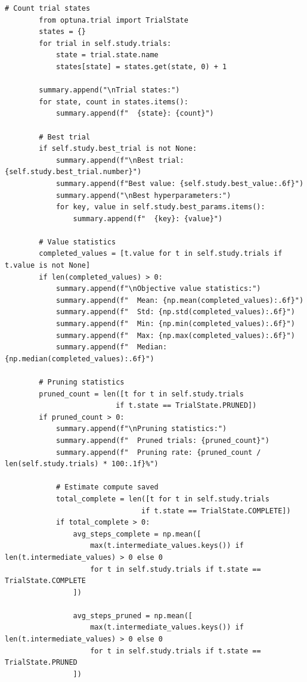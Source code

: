 \begin{lstlisting}[style=python, caption=Comprehensive HPO analysis and visualization]
        # Count trial states
        from optuna.trial import TrialState
        states = {}
        for trial in self.study.trials:
            state = trial.state.name
            states[state] = states.get(state, 0) + 1

        summary.append("\nTrial states:")
        for state, count in states.items():
            summary.append(f"  {state}: {count}")

        # Best trial
        if self.study.best_trial is not None:
            summary.append(f"\nBest trial: {self.study.best_trial.number}")
            summary.append(f"Best value: {self.study.best_value:.6f}")
            summary.append("\nBest hyperparameters:")
            for key, value in self.study.best_params.items():
                summary.append(f"  {key}: {value}")

        # Value statistics
        completed_values = [t.value for t in self.study.trials if t.value is not None]
        if len(completed_values) > 0:
            summary.append(f"\nObjective value statistics:")
            summary.append(f"  Mean: {np.mean(completed_values):.6f}")
            summary.append(f"  Std: {np.std(completed_values):.6f}")
            summary.append(f"  Min: {np.min(completed_values):.6f}")
            summary.append(f"  Max: {np.max(completed_values):.6f}")
            summary.append(f"  Median: {np.median(completed_values):.6f}")

        # Pruning statistics
        pruned_count = len([t for t in self.study.trials
                          if t.state == TrialState.PRUNED])
        if pruned_count > 0:
            summary.append(f"\nPruning statistics:")
            summary.append(f"  Pruned trials: {pruned_count}")
            summary.append(f"  Pruning rate: {pruned_count / len(self.study.trials) * 100:.1f}%")

            # Estimate compute saved
            total_complete = len([t for t in self.study.trials
                                if t.state == TrialState.COMPLETE])
            if total_complete > 0:
                avg_steps_complete = np.mean([
                    max(t.intermediate_values.keys()) if len(t.intermediate_values) > 0 else 0
                    for t in self.study.trials if t.state == TrialState.COMPLETE
                ])

                avg_steps_pruned = np.mean([
                    max(t.intermediate_values.keys()) if len(t.intermediate_values) > 0 else 0
                    for t in self.study.trials if t.state == TrialState.PRUNED
                ])


\end{lstlisting}
